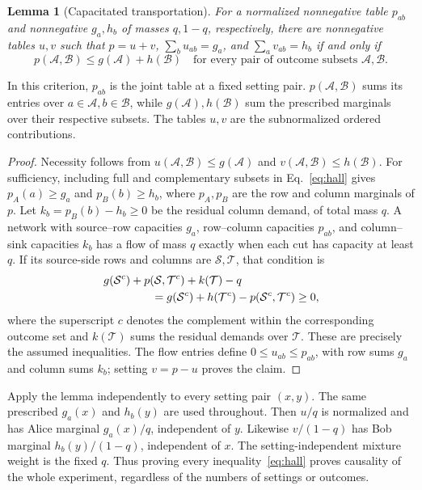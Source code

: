 \documentclass[11pt]{article}
\newtheorem{lemma}{Lemma}
\begin{document}
\begin{lemma}[Capacitated transportation]
For a normalized nonnegative table $p_{ab}$ and nonnegative $g_a,h_b$ of masses $q,1-q$, respectively, there are nonnegative tables $u,v$ such that $p=u+v$, $\sum_bu_{ab}=g_a$, and $\sum_av_{ab}=h_b$ if and only if
\begin{equation}
 p(\mathcal A,\mathcal B)\le g(\mathcal A)+h(\mathcal B)
 \quad\text{for every pair of outcome subsets }\mathcal A,\mathcal B.
 \label{eq:hall}
\end{equation}
\end{lemma}
In this criterion, $p_{ab}$ is the joint table at a fixed setting pair. $p(\mathcal A,\mathcal B)$ sums its entries over $a\in\mathcal A,b\in\mathcal B$, while $g(\mathcal A),h(\mathcal B)$ sum the prescribed marginals over their respective subsets. The tables $u,v$ are the subnormalized ordered contributions.
\begin{proof}
Necessity follows from $u(\mathcal A,\mathcal B)\le g(\mathcal A)$ and $v(\mathcal A,\mathcal B)\le h(\mathcal B)$. For sufficiency, including full and complementary subsets in Eq.~\eqref{eq:hall} gives $p_A(a)\ge g_a$ and $p_B(b)\ge h_b$, where $p_A,p_B$ are the row and column marginals of $p$. Let $k_b=p_B(b)-h_b\ge0$ be the residual column demand, of total mass $q$. A network with source--row capacities $g_a$, row--column capacities $p_{ab}$, and column--sink capacities $k_b$ has a flow of mass $q$ exactly when each cut has capacity at least $q$. If its source-side rows and columns are $\mathcal S,\mathcal T$, that condition is
\begin{align}
 &g(\mathcal S^c)+p(\mathcal S,\mathcal T^c)+k(\mathcal T)-q\notag\\
 &\hspace{15mm}=g(\mathcal S^c)+h(\mathcal T^c)
                   -p(\mathcal S^c,\mathcal T^c)\ge0,
 \label{eq:flow-cuts}
\end{align}
where the superscript $c$ denotes the complement within the corresponding outcome set and $k(\mathcal T)$ sums the residual demands over $\mathcal T$. These are precisely the assumed inequalities. The flow entries define $0\le u_{ab}\le p_{ab}$, with row sums $g_a$ and column sums $k_b$; setting $v=p-u$ proves the claim.
\end{proof}

Apply the lemma independently to every setting pair $(x,y)$. The same prescribed $g_a(x)$ and $h_b(y)$ are used throughout. Then $u/q$ is normalized and has Alice marginal $g_a(x)/q$, independent of $y$. Likewise $v/(1-q)$ has Bob marginal $h_b(y)/(1-q)$, independent of $x$. The setting-independent mixture weight is the fixed $q$. Thus proving every inequality~\eqref{eq:hall} proves causality of the whole experiment, regardless of the numbers of settings or outcomes.
\end{document}
